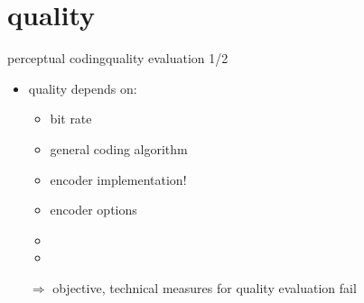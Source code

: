 \section[quality]{quality}
	\begin{frame}{perceptual coding}{quality evaluation 1/2}
		\begin{itemize}
			\item	quality depends on:
			\begin{itemize}
				\item	bit rate
				\item	general coding algorithm
				\item	encoder implementation!
				\item	encoder options
				\item	{}
				\item	{}
			\end{itemize}
			\pause
			$\Rightarrow$ objective, technical measures for quality evaluation fail
		\end{itemize}
	\end{frame}		

